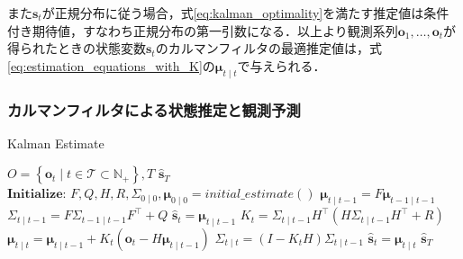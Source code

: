        また$\bm{s}_t$が正規分布に従う場合，式\ref{eq:kalman_optimality}を満たす推定値は条件付き期待値，すなわち正規分布の第一引数になる．以上より観測系列$\bm{o}_1, \dots, \bm{o}_t$が得られたときの状態変数$\bm{s}_t$のカルマンフィルタの最適推定値は，式\ref{eq:estimation_equations_with_K}の$\bm{\mu}_{t \mid t}$で与えられる．

        \subsubsection{カルマンフィルタによる状態推定と観測予測}

        \begin{algorithm}[t]
            \caption[Kalman Estimate]{Kalman Estimate}
            \label{alg:kalman_estimate}
            \begin{algorithmic}[1]
                \Require $O = \left\{\bm{o}_t \mid t \in \mathcal{T} \subset \mathbb{N}_+\right\}, T$
                \Ensure $\hat{\bm{s}}_T$
                \State $\textbf{Initialize: } F, Q, H, R, \Sigma_{0 \mid 0}, \bm{\mu}_{0 \mid 0} = initial\_estimate()$
                    \State $\bm{\mu}_{t \mid t-1} = F \bm{\mu}_{t-1 \mid t-1}$
                    \State $\Sigma_{t \mid t-1} = F \Sigma_{t-1 \mid t-1} F^{\top} + Q$
                    \State $\hat{\bm{s}}_t = \bm{\mu}_{t \mid t-1}$
                        \State $K_t = \Sigma_{t \mid t-1} H^{\top} \left( H \Sigma_{t \mid t-1} H^{\top} + R\right)$
                        \State $\bm{\mu}_{t \mid t} = \bm{\mu}_{t \mid t-1} + K_t \left( \bm{o}_t - H \bm{\mu}_{t \mid t-1} \right)$
                        \State $\Sigma_{t \mid t} = \left( I - K_t H \right) \Sigma_{t \mid t-1}$
                        \State $\hat{\bm{s}}_t = \bm{\mu}_{t \mid t}$
                    \EndIf
                \EndFor
                \State \Return $\hat{\bm{s}}_T$
            \end{algorithmic}
        \end{algorithm}

